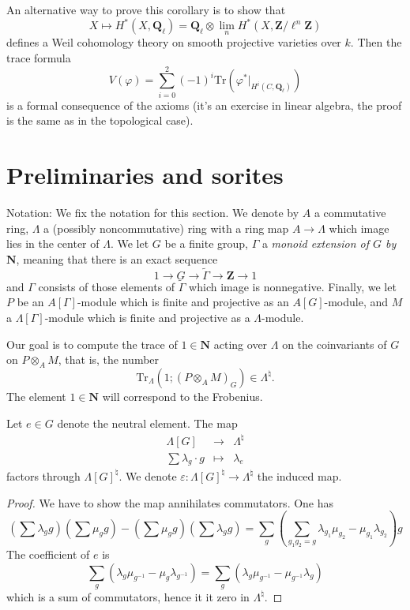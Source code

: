 \noindent
An alternative way to prove this corollary is to show that
$$
X \mapsto H^* (X, \mathbf{Q}_\ell) =
\mathbf{Q}_\ell \otimes
\lim_n H^*(X, \mathbf{Z}/\ell^n\mathbf{Z})
$$
defines a Weil cohomology theory on smooth projective varieties over $k$. Then
the trace formula
$$
V(\varphi) = \sum_{i = 0}^2 (-1)^i
\text{Tr}(\varphi^* |_{H^i(C, \mathbf{Q}_\ell)})
$$
is a formal consequence of the axioms (it's an exercise in linear algebra, the
proof is the same as in the topological case).




\section{Preliminaries and sorites}
\label{section-preliminaries}

\noindent
Notation:
We fix the notation for this section. We denote by $A$ a commutative ring,
$\Lambda$ a (possibly noncommutative) ring with a ring map $A\to \Lambda$ which
image lies in the center of $\Lambda$. We let $G$ be a finite group, $\Gamma$ a
{\it monoid extension of $G$ by $\mathbf{N}$}, meaning that there is an exact
sequence
$$
1\to G\to \tilde\Gamma\to \mathbf{Z}\to 1
$$
and $\Gamma$ consists of those elements of $\tilde\Gamma$ which image is
nonnegative. Finally, we let $P$ be an $A[\Gamma]$-module which is finite and
projective as an $A[G]$-module, and $M$ a $\Lambda[\Gamma]$-module which is
finite and projective as a $\Lambda$-module.

\medskip\noindent
Our goal is to compute the trace of $1 \in \mathbf{N}$ acting over $\Lambda$
on the coinvariants of $G$ on $P \otimes_A M$, that is, the number
$$
\text{Tr}_{\Lambda}\left(1; \left(P \otimes_A M\right)_G\right) \in
\Lambda^\natural.
$$
The element $1\in \mathbf{N}$ will correspond to the Frobenius.

\begin{lemma}
\label{lemma-epsilon}
Let $e\in G$ denote the neutral element. The map
$$
\begin{matrix}
\Lambda[G] & \longrightarrow & \Lambda^{\natural}\\
\sum \lambda_g\cdot g & \longmapsto & \lambda_e
\end{matrix}
$$
factors through $\Lambda[G]^\natural$. We denote
$\varepsilon : \Lambda[G]^\natural\to \Lambda^\natural$ the induced map.
\end{lemma}

\begin{proof}
We have to show the map annihilates commutators. One has
$$
\left(\sum\lambda_g g\right)\left(\sum\mu_g g\right)-\left(\sum \mu_g
g\right)\left(\sum\lambda_g g\right)
= \sum_g\left(\sum_{g_1g_2=g}
\lambda_{g_1}\mu_{g_2}-\mu_{g_1}\lambda_{g_2}\right)g
$$
The coefficient of $e$ is
$$
\sum_g\left(\lambda_g\mu_{g^{-1}}-\mu_g\lambda_{g^{-1}}\right) =
\sum_g\left(\lambda_g\mu_{g^{-1}}-\mu_{g^{-1}}\lambda_g\right)
$$
which is a sum of commutators, hence it it zero in $\Lambda^\natural$.
\end{proof}


